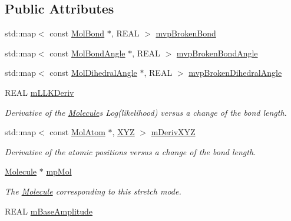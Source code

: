 \subsection*{Public Attributes}
\begin{DoxyCompactItemize}
\item 
std\+::map$<$ const \mbox{\hyperlink{class_obj_cryst_1_1_mol_bond}{Mol\+Bond}} $\ast$, R\+E\+AL $>$ \mbox{\hyperlink{struct_obj_cryst_1_1_stretch_mode_a6628812c69f20a7a18a7a3759b5c961c}{mvp\+Broken\+Bond}}
\item 
std\+::map$<$ const \mbox{\hyperlink{class_obj_cryst_1_1_mol_bond_angle}{Mol\+Bond\+Angle}} $\ast$, R\+E\+AL $>$ \mbox{\hyperlink{struct_obj_cryst_1_1_stretch_mode_a2a46f6bd997850be6736e4b5746deeed}{mvp\+Broken\+Bond\+Angle}}
\item 
std\+::map$<$ const \mbox{\hyperlink{class_obj_cryst_1_1_mol_dihedral_angle}{Mol\+Dihedral\+Angle}} $\ast$, R\+E\+AL $>$ \mbox{\hyperlink{struct_obj_cryst_1_1_stretch_mode_a84257bc829a3d612b68046d33685e59e}{mvp\+Broken\+Dihedral\+Angle}}
\item 
\mbox{\label{struct_obj_cryst_1_1_stretch_mode_ac6614921c015de3f6d67b22ae512a66c}} 
R\+E\+AL \mbox{\hyperlink{struct_obj_cryst_1_1_stretch_mode_ac6614921c015de3f6d67b22ae512a66c}{m\+L\+L\+K\+Deriv}}
\begin{DoxyCompactList}\small\item\em Derivative of the \mbox{\hyperlink{class_obj_cryst_1_1_molecule}{Molecule}}\textquotesingle{}s Log(likelihood) versus a change of the bond length. \end{DoxyCompactList}\item 
\mbox{\label{struct_obj_cryst_1_1_stretch_mode_a4a25093e177c56be142acc954149c110}} 
std\+::map$<$ const \mbox{\hyperlink{class_obj_cryst_1_1_mol_atom}{Mol\+Atom}} $\ast$, \mbox{\hyperlink{struct_obj_cryst_1_1_x_y_z}{X\+YZ}} $>$ \mbox{\hyperlink{struct_obj_cryst_1_1_stretch_mode_a4a25093e177c56be142acc954149c110}{m\+Deriv\+X\+YZ}}
\begin{DoxyCompactList}\small\item\em Derivative of the atomic positions versus a change of the bond length. \end{DoxyCompactList}\item 
\mbox{\label{struct_obj_cryst_1_1_stretch_mode_a380bd0aef1e5be1f681364e0f754f3e3}} 
\mbox{\hyperlink{class_obj_cryst_1_1_molecule}{Molecule}} $\ast$ \mbox{\hyperlink{struct_obj_cryst_1_1_stretch_mode_a380bd0aef1e5be1f681364e0f754f3e3}{mp\+Mol}}
\begin{DoxyCompactList}\small\item\em The \mbox{\hyperlink{class_obj_cryst_1_1_molecule}{Molecule}} corresponding to this stretch mode. \end{DoxyCompactList}\item 
R\+E\+AL \mbox{\hyperlink{struct_obj_cryst_1_1_stretch_mode_aa8dc03e2bd6840d13964dd6751c39fae}{m\+Base\+Amplitude}}
\end{DoxyCompactItemize}


